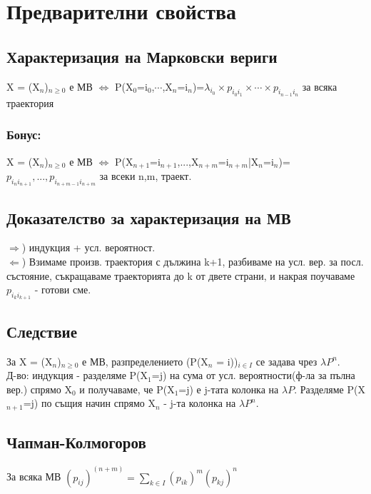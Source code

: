 \documentclass{article}
\begin{document}
\section{Предварителни свойства}
\subsection{Характеризация на Марковски вериги}
X = (X$_n$)$_{n\geq0}$ е МВ $\Leftrightarrow$ P(X$_0$=i$_0$,$\cdots$,X$_n$=i$_n$)=$\lambda_{i_0}\times p_{i_0i_1}\times\cdots\times p_{i_{n-1}i_n}$ за всяка траектория

\subsubsection*{Бонус:}
X = (X$_n$)$_{n\geq0}$ е МВ $\Leftrightarrow$ P(X$_{n+1}$=i$_{n+1}$,...,X$_{n+m}$=i$_{n+m}$|X$_n$=i$_n$)=$p_{i_ni_{n+1}},...,p_{i_{n+m-1}i_{n+m}}$ за всеки n,m, траект.

\subsection{Доказателство за характеризация на МВ}
$\Rightarrow$) индукция + усл. вероятност. \\
$\Leftarrow$) Взимаме произв. траектория с дължина k+1, разбиваме на усл. вер. за посл. състояние, съкращаваме
траекторията до k от двете страни, и накрая поучаваме $p_{i_ki_{k+1}}$ - готови сме.

\subsection{Следствие}
За X = (X$_n$)$_{n\geq0}$ е МВ, разпределението (P(X$_n$ = i))$_{i\in I}$ се задава чрез $\lambda P^n$. \\
Д-во: индукция - разделяме P(X$_1$=j) на сума от усл. вероятности(ф-ла за пълна вер.) спрямо X$_0$ и получаваме, че 
P(X$_1$=j) е j-тата колонка на $\lambda P$. Разделяме P(X$_{n+1}$=j) по същия начин спрямо X$_n$ - j-та колонка на $\lambda P^n$.

\subsection{Чапман-Колмогоров}
За всяка МВ $(p_{ij})^{(n+m)}=\sum_{k\in I} (p_{ik})^m(p_{kj})^n$
\end{document}
